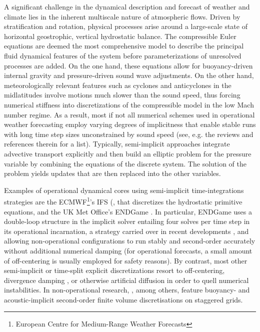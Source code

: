 \documentclass{ametsoc}
\theoremstyle{definition}
\begin{document}
A significant challenge in the dynamical description and forecast of weather and climate lies in the inherent multiscale nature of atmospheric flows. Driven by stratification and rotation, physical processes arise around a large-scale state of horizontal geostrophic, vertical hydrostatic balance. The compressible Euler equations are deemed the most comprehensive model to describe the principal fluid dynamical features of the system before parameterizations of unresolved processes are added. On the one hand, these equations allow for buoyancy-driven internal gravity and pressure-driven sound wave adjustments.  On the other hand, meteorologically relevant features such as cyclones and anticyclones in the midlatitudes involve motions much slower than the sound speed, thus forcing numerical stiffness into discretizations of the compressible model in the low Mach number regime. As a result, most if not all numerical schemes used in operational weather forecasting employ varying degrees of implicitness that enable stable runs with long time step sizes unconstrained by sound speed (see, e.g. the reviews \cite{MarrasEtAl2016, MengaldoEtAl2018} and references therein for a list). Typically, semi-implicit approaches integrate advective transport explicitly and then build an elliptic problem for the pressure variable by combining the equations of the discrete system. The solution of the problem yields updates that are then replaced into the other variables. 

Examples of operational dynamical cores using semi-implicit time-integrations strategies are the ECMWF\footnote{European Centre for Medium-Range Weather Forecasts}'s IFS (\cite{Hortal2002}, that discretizes the hydrostatic primitive equations, and the UK Met Office's ENDGame \citep{WoodEtAl2013, BenacchioWood2016}. In particular, ENDGame  uses a double-loop structure in the implicit solver entailing four solves per time step in its operational incarnation, a strategy carried over in recent developments \citep{MelvinEtAl2018}, and allowing non-operational configurations to run stably and second-order accurately without additional numerical damping (for operational forecasts, a small amount of off-centering is usually employed for safety reasons). By contrast, most other semi-implicit or time-split explicit discretizations resort to off-centering, divergence damping \citep{BryanFritsch2002}, or otherwise artificial diffusion in order to quell numerical instabilities. In non-operational research, \cite{DumbserEtAl2018}, among others, feature buoyancy- and acoustic-implicit second-order finite volume discretisations on staggered grids.
\end{document}
